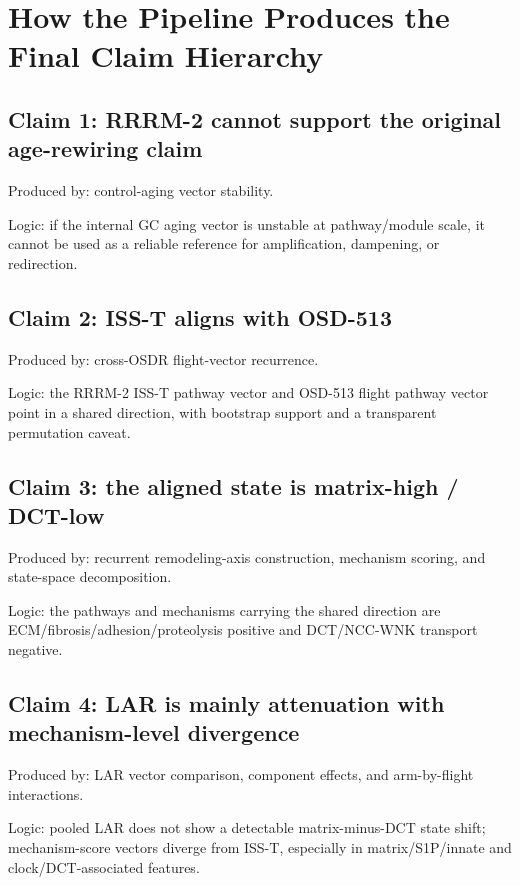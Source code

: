 \documentclass[11pt]{article}
\begin{document}
\section{How the Pipeline Produces the Final Claim Hierarchy}

\subsection{Claim 1: RRRM-2 cannot support the original age-rewiring claim}

Produced by: control-aging vector stability.

Logic: if the internal GC aging vector is unstable at pathway/module scale, it cannot be used as a reliable reference for amplification, dampening, or redirection.

\subsection{Claim 2: ISS-T aligns with OSD-513}

Produced by: cross-OSDR flight-vector recurrence.

Logic: the RRRM-2 ISS-T pathway vector and OSD-513 flight pathway vector point in a shared direction, with bootstrap support and a transparent permutation caveat.

\subsection{Claim 3: the aligned state is matrix-high / DCT-low}

Produced by: recurrent remodeling-axis construction, mechanism scoring, and state-space decomposition.

Logic: the pathways and mechanisms carrying the shared direction are ECM/fibrosis/adhesion/proteolysis positive and DCT/NCC-WNK transport negative.

\subsection{Claim 4: LAR is mainly attenuation with mechanism-level divergence}

Produced by: LAR vector comparison, component effects, and arm-by-flight interactions.

Logic: pooled LAR does not show a detectable matrix-minus-DCT state shift; mechanism-score vectors diverge from ISS-T, especially in matrix/S1P/innate and clock/DCT-associated features.
\end{document}

